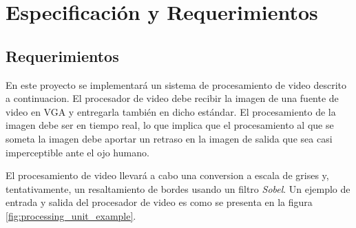 \documentclass[10pt, letterpaper, conference]{IEEEtran}
\begin{document}
\section{Especificaci\'on y Requerimientos}
\label{sec:req}

\subsection{Requerimientos}

En este proyecto se implementar\'a un sistema de procesamiento de
video descrito a continuacion.  El procesador de video debe recibir la
imagen de una fuente de video en VGA y entregarla tambi\'en en dicho
est\'andar. El procesamiento de la imagen debe ser en tiempo real, lo que
implica que el procesamiento al que se someta la imagen debe aportar
un retraso en la imagen de salida que sea casi imperceptible ante el
ojo humano.

El procesamiento de video llevar\'a a cabo una conversion a escala de
grises y, tentativamente, un resaltamiento de bordes usando un filtro
\emph{Sobel}. Un ejemplo de entrada y salida del procesador de video
es como se presenta en la figura \ref{fig:processing_unit_example}.
\end{document}
